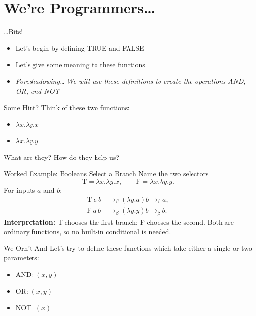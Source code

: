 \documentclass{beamer}
\begin{document}
\section{We're Programmers\dots}
\begin{frame}{\dots Bits!}
  \begin{itemize}
    \item Let's begin by defining TRUE and FALSE
    \item Let's give some meaning to these functions
    \item \emph{Foreshadowing\dots{} We will use these definitions to create the operations AND, OR, and NOT}
  \end{itemize}
\end{frame}
\begin{frame}{Some Hint?}
  Think of these two functions:
  \begin{itemize}
    \item $\lambda x.\lambda y.x$
    \item $\lambda x.\lambda y.y$
  \end{itemize}
  What are they? How do they help us?
\end{frame}
\begin{frame}{Worked Example: Booleans Select a Branch}
  Name the two selectors
  \[\mathrm{T}=\lambda x.\lambda y.x,\qquad
    \mathrm{F}=\lambda x.\lambda y.y.\]
  For inputs $a$ and $b$:
  \begin{align*}
    \mathrm{T}\ a\ b&\to_\beta(\lambda y.a)b\to_\beta a,\\
    \mathrm{F}\ a\ b&\to_\beta(\lambda y.y)b\to_\beta b.
  \end{align*}
  \textbf{Interpretation:} T chooses the first branch; F chooses the second.
  Both are ordinary functions, so no built-in conditional is needed.
\end{frame}
\begin{frame}{We Orn’t And}
  Let's try to define these functions which take either a single or two parameters:
  \begin{itemize}
    \item AND: $(x,y)$
    \item OR: $(x,y)$
    \item NOT: $(x)$
  \end{itemize}
\end{frame}
\end{document}
